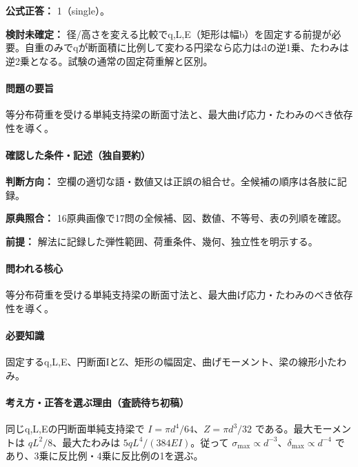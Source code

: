 \textbf{公式正答：} 1（single）。

\par\textbf{検討未確定：} 径/高さを変える比較でq,L,E（矩形は幅b）を固定する前提が必要。自重のみでqが断面積に比例して変わる円梁なら応力はdの逆1乗、たわみは逆2乗となる。試験の通常の固定荷重解と区別。

\paragraph{問題の要旨} 等分布荷重を受ける単純支持梁の断面寸法と、最大曲げ応力・たわみのべき依存性を導く。

\paragraph{確認した条件・記述（独自要約）}\mbox{}\par

\noindent\textbf{判断方向：} 空欄の適切な語・数値又は正誤の組合せ。全候補の順序は各肢に記録。\par

\noindent\textbf{原典照合：} 16原典画像で17問の全候補、図、数値、不等号、表の列順を確認。\par

\noindent\textbf{前提：} 解法に記録した弾性範囲、荷重条件、幾何、独立性を明示する。\par

\paragraph{問われる核心} 等分布荷重を受ける単純支持梁の断面寸法と、最大曲げ応力・たわみのべき依存性を導く。

\paragraph{必要知識} 固定するq,L,E、円断面IとZ、矩形の幅固定、曲げモーメント、梁の線形小たわみ。

\paragraph{考え方・正答を選ぶ理由（査読待ち初稿）} 同じq,L,Eの円断面単純支持梁で \(I=\pi d^4/64\)、\(Z=\pi d^3/32\) である。最大モーメントは \(qL^2/8\)、最大たわみは \(5qL^4/(384EI)\)。従って \(\sigma_{\max}\propto d^{-3}\)、\(\delta_{\max}\propto d^{-4}\) であり、3乗に反比例・4乗に反比例の1を選ぶ。

